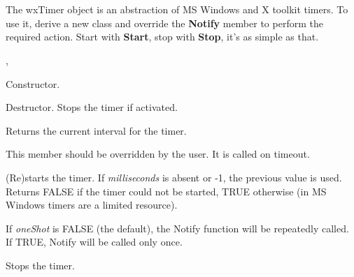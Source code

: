 \section{}\label{wxtimer}

The wxTimer object is an abstraction of MS Windows and X toolkit timers. To
use it, derive a new class and override the {\bf Notify} member to
perform the required action. Start with {\bf Start}, stop with {\bf
Stop}, it's as simple as that.




, 




Constructor.



Destructor. Stops the timer if activated.



Returns the current interval for the timer.



This member should be overridden by the user. It is called on timeout.



(Re)starts the timer. If {\it milliseconds}\/ is absent or -1, the
previous value is used. Returns FALSE if the timer could not be started,
TRUE otherwise (in MS Windows timers are a limited resource).

If {\it oneShot} is FALSE (the default), the Notify function will be repeatedly
called. If TRUE, Notify will be called only once.



Stops the timer.


